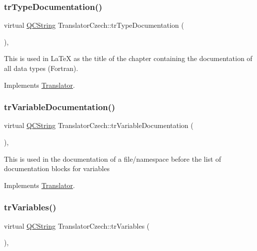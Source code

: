 \subsubsection{\texorpdfstring{trTypeDocumentation()}{trTypeDocumentation()}}
{\footnotesize\ttfamily virtual \mbox{\hyperlink{class_q_c_string}{Q\+C\+String}} Translator\+Czech\+::tr\+Type\+Documentation (\begin{DoxyParamCaption}{ }\end{DoxyParamCaption})\hspace{0.3cm}{\ttfamily [inline]}, {\ttfamily [virtual]}}

This is used in La\+TeX as the title of the chapter containing the documentation of all data types (Fortran). 

Implements \mbox{\hyperlink{class_translator}{Translator}}.

\mbox{\label{class_translator_czech_a38ce49b486e7b3035be083f33287d65c}} 
\subsubsection{\texorpdfstring{trVariableDocumentation()}{trVariableDocumentation()}}
{\footnotesize\ttfamily virtual \mbox{\hyperlink{class_q_c_string}{Q\+C\+String}} Translator\+Czech\+::tr\+Variable\+Documentation (\begin{DoxyParamCaption}{ }\end{DoxyParamCaption})\hspace{0.3cm}{\ttfamily [inline]}, {\ttfamily [virtual]}}

This is used in the documentation of a file/namespace before the list of documentation blocks for variables 

Implements \mbox{\hyperlink{class_translator}{Translator}}.

\mbox{\label{class_translator_czech_a3dc668d74216cc62f14c9166702f5d95}} 
\subsubsection{\texorpdfstring{trVariables()}{trVariables()}}
{\footnotesize\ttfamily virtual \mbox{\hyperlink{class_q_c_string}{Q\+C\+String}} Translator\+Czech\+::tr\+Variables (\begin{DoxyParamCaption}{ }\end{DoxyParamCaption})\hspace{0.3cm}{\ttfamily [inline]}, {\ttfamily [virtual]}}

